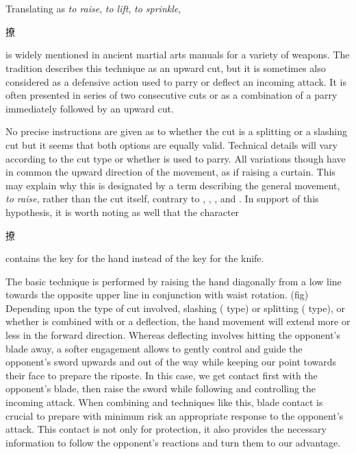 \section{\Liao{}}
Translating as \textit{to raise}, \textit{to lift}, \textit{to sprinkle}, \Liao{} \begin{CJK*}{UTF8}{bsmi}撩\end{CJK*} is widely mentioned in ancient martial arts manuals for a variety of weapons. The \Yangjia{} \Michuan{} tradition describes this technique as an upward cut, but it is sometimes also considered as a defensive action used to parry or deflect an incoming attack. It is often presented in series of two consecutive cuts or as a combination of a \Liao{} parry immediately followed by an upward cut. 

No precise instructions are given as to whether the cut is a splitting or a slashing cut but it seems that both options are equally valid. Technical details will vary according to the cut type or whether \Liao{} is used to parry.
All variations though have in common the upward direction of the movement, as if raising a curtain. This may explain why this \Jianfa{} is designated by a term describing the general movement, \textit{to raise}, rather than the cut itself, contrary to \Ci{}, \Pi{}, \Duo{}, and \Hua{}. In support of this hypothesis, it is worth noting as well that the \Liao{} character \begin{CJK*}{UTF8}{bsmi}撩\end{CJK*} contains the key for the hand instead of the key for the knife.

The basic \Liao{} technique is performed by raising the hand diagonally from a low line towards the opposite upper line in conjunction with waist rotation. (fig)
Depending upon the type of cut involved, slashing (\Hua{} type) or splitting (\Pi{} type), or whether \Liao{} is combined with \Mo{} or a deflection, the hand movement will extend more or less in the forward direction. 
Whereas deflecting involves hitting the opponent's blade away, a softer engagement allows to gently control and guide the opponent's sword upwards and out of the way while keeping our point towards their face to prepare the riposte. In this case, we get contact first with the opponent's blade, then raise the sword while following and controlling the incoming attack. When combining \Liao{} and \Mo{} techniques like this, blade contact is crucial to prepare with minimum risk an appropriate response to the opponent's attack. This contact is not only for protection, it also provides the necessary information to follow the opponent's reactions and turn them to our advantage. 


